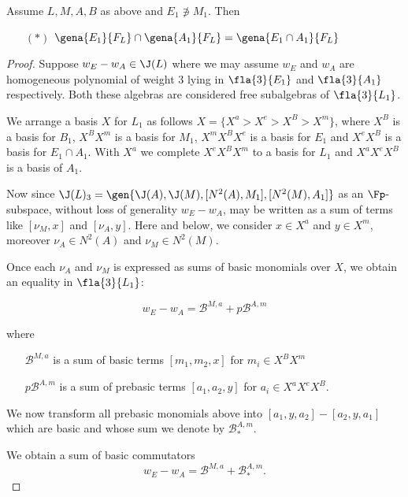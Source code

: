 \documentclass[a4paper,11pt,german,english]{article}
\begin{document}
\begin{lem*}
Assume $L,M,A,B$ as above and $E_{1}\nni M_{1}$. Then
\begin{itemize}
\item[$(*)$]\quad\quad$\gena{E_{1}}{F_L}\cap\gena{A_{1}}{F_L}=\gena{E_{1}\cap A_{1}}{F_L}$
\end{itemize}
\end{lem*}
\begin{proof}
Suppose $w_{E}-w_{A}\in\J(L)$ where we
may assume $w_{E}$ and $w_{A}$ are homogeneous polynomial of weight $3$ lying
in $\fla{3}{E_{1}}$ and $\fla{3}{A_{1}}$ respectively. Both these algebras are considered
free subalgebras of $\fla{3}{L_{1}}$.

We arrange a basis $X$ for $L_{1}$ as follows $X=\{X^{a}>X^{e}>X^{B}>X^{m}\}$, where
$X^{B}$ is a basis for $B_{1}$, $X^{B}X^{m}$ is a basis for $M_{1}$, $X^{m}X^{B}X^{e}$ is
a basis for $E_{1}$ and $X^{e}X^{B}$ is a basis for $E_{1}\cap A_{1}$. With $X^{a}$ we complete
$X^{e}X^{B}X^{m}$ to a basis for $L_{1}$ and $X^{a}X^{e}X^{B}$ is a basis of $A_{1}$.


Now  since $\J(L)_{3}=\gen{\J(A),\J(M),[N^{2}(A),M_{1}],[N^{2}(M),A_{1}]}$ as an $\Fp$-subspace,
without loss of generality $w_{E}-w_{A}$, may be written as a sum of terms like
$[\nu_{M},x]$ and %
$[\nu_{A},y]$. Here and below, we consider $x\in X^{a}$ %
and $y\in X^{m}$, moreover $\nu_{A}\in N^{2}(A)$ and $\nu_{M}\in N^{2}(M)$.

Once each $\nu_{A}$ and $\nu_{M}$ is expressed as sums of basic monomials over $X$, we obtain an equality in $\fla{3}{L_{1}}$:

$$w_{E}-w_{A}=\mathcal{B}^{M,a}+%
p\mathcal{B}^{A,m}$$

where 
\begin{itemize}
\item[$\mathcal{B}^{M,a}$] is a sum of basic terms $[m_{1},m_{2},x]$ for $m_{i}\in X^{B}X^{m}$
\item[$p\mathcal{B}^{A,m}$]is a sum of prebasic terms $[a_{1},a_{2},y]$ for $a_{i}\in X^{a}X^{e}X^{B}$.
\end{itemize}
We now transform all prebasic monomials above into $[a_{1},y,a_{2}]-[a_{2},y,a_{1}]$ which are basic
and whose sum we denote by $\mathcal{B}^{A,m}_{*}$.

We obtain a sum of basic commutators
$$w_{E}-w_{A}=\mathcal{B}^{M,a}+
\mathcal{B}^{A,m}_{*}.$$


\end{proof}
\end{document}
